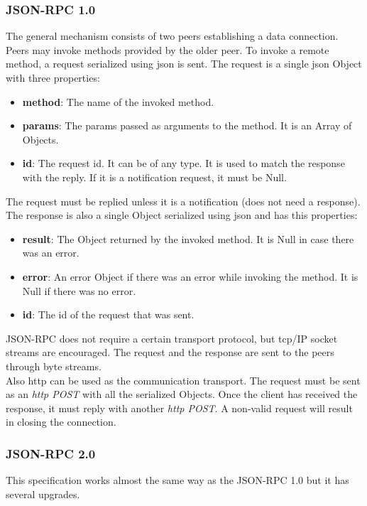 \subsubsection{JSON-RPC 1.0}
The general mechanism consists of two peers establishing a data connection\cite{json-rpc-1}. Peers may invoke methods provided by the older peer. To invoke a remote method, a request serialized using \acrshort{json} is sent. The request is a single \acrshort{json} Object with three properties:
\begin{itemize}
    \item \textbf{method}: The name of the invoked method.
    \item \textbf{params}: The params passed as arguments to the method. It is an Array of Objects.
    \item \textbf{id}: The request id. It can be of any type. It is used to match the response with the reply. If it is a notification request, it must be Null.
\end{itemize}
The request must be replied unless it is a notification (does not need a response). The response is also a single Object serialized using \acrshort{json} and has this properties:
\begin{itemize}
    \item \textbf{result}: The Object returned by the invoked method. It is Null in case there was an error.
    \item \textbf{error}: An error Object if there was an error while invoking the method. It is Null if there was no error.
    \item \textbf{id}: The id of the request that was sent.
\end{itemize}
JSON-RPC does not require a certain transport protocol, but \acrshort{tcp}/IP socket streams are encouraged. The request and the response are sent to the peers through byte streams.\\

Also \acrshort{http} can be used as the communication transport. The request must be sent as an \textit{\acrshort{http} POST} with all the serialized Objects. Once the client has received the response, it must reply with another \textit{\acrshort{http} POST}. A non-valid request will result in closing the connection.
\subsubsection{JSON-RPC 2.0}
This specification\cite{json-rpc-2} works almost the same way as the JSON-RPC 1.0 but it has several upgrades.\\

